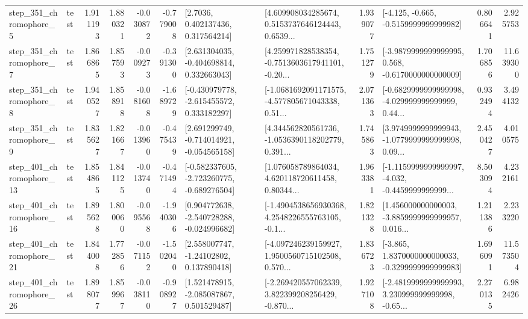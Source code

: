 \begin{tabular}{llrrrrllrlrr}
   step\_351\_chromophore\_5 &      test &      1.911193 &    1.880321 &     -0.030872 & -0.779008 &          [2.7036, 0.402137436, 0.317564214] &  [4.609908034285674, 0.5153737646124443, 0.6539... &       1.939077 &              [-4.125, -0.665, -0.5159999999999982] &            0.806641 &          2.925753 \\
   step\_351\_chromophore\_7 &      test &      1.866865 &    1.857593 &     -0.009273 & -0.391300 &    [2.631304035, -0.404698814, 0.332663043] &  [4.259971828538354, -0.7513603617941101, -0.20... &       1.751279 &  [-3.9879999999999995, 0.568, -0.6170000000000009] &            1.706856 &         11.639300 \\
   step\_351\_chromophore\_8 &      test &      1.940527 &    1.858918 &     -0.081608 & -1.689729 &   [-0.430979778, -2.615455572, 0.333182297] &  [-1.0681692091171575, -4.577805671043338, 0.51... &       2.071363 &  [-0.6829999999999998, -4.029999999999999, 0.44... &            0.932494 &          3.494132 \\
   step\_351\_chromophore\_9 &      test &      1.835627 &    1.821667 &     -0.013960 & -0.475439 &   [2.691299749, -0.714014921, -0.054565158] &  [4.344562820561736, -1.0536390118202779, 0.391... &       1.745863 &  [3.9749999999999943, -1.0779999999999998, 0.09... &            2.450427 &          4.010575 \\
  step\_401\_chromophore\_13 &      test &      1.854865 &    1.841125 &     -0.013740 & -0.471494 &  [-0.582337605, -2.723260775, -0.689276504] &  [1.076058789864034, 4.620118720611458, 0.80344... &       1.963381 &  [-1.1159999999999997, -4.032, -0.4459999999999... &            8.503094 &          4.232161 \\
  step\_401\_chromophore\_16 &      test &      1.895628 &    1.800060 &     -0.095568 & -1.940306 &   [0.904772638, -2.540728288, -0.024996682] &  [-1.4904538656930368, 4.2548226555763105, -0.1... &       1.821328 &  [1.456000000000003, -3.8859999999999957, 0.016... &            1.211386 &          2.233220 \\
  step\_401\_chromophore\_21 &      test &      1.844008 &    1.772856 &     -0.071152 & -1.502040 &     [2.558007747, -1.24102802, 0.137890418] &  [-4.097246239159927, 1.9500560715102508, 0.570... &       1.836723 &  [-3.865, 1.8370000000000033, -0.3299999999999983] &            1.696091 &         11.573504 \\
  step\_401\_chromophore\_26 &      test &      1.898077 &    1.859967 &     -0.038110 & -0.908927 &    [1.521478915, -2.085087867, 0.501529487] &  [-2.269420557062339, 3.822399208256429, -0.870... &       1.927108 &  [-2.4819999999999993, 3.230999999999998, -0.65... &            2.270135 &          6.982426 \\

\end{tabular}
